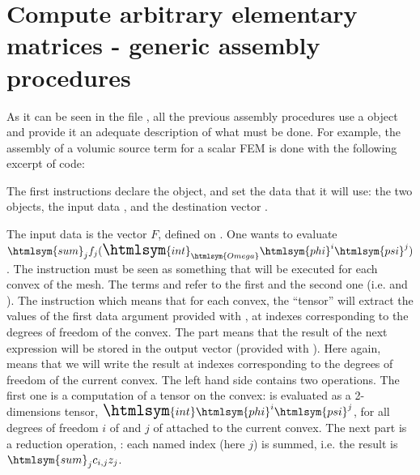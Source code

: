 \documentclass[11pt,a4paper]{article}
\newcommand{\phi}{\htmlsym{phi}}
\newcommand{\psi}{\htmlsym{psi}}
\newcommand{\Omega}{\htmlsym{Omega}}
\newcommand{\sum}{\htmlsym{sum}}
\newcommand{\int}{{\Large\htmlsym{int}}}
\begin{document}
\section{Compute arbitrary elementary matrices - generic assembly procedures}
As it can be seen in the file , all the
previous assembly procedures use a  object and
provide it an adequate description of what must be done. For example, 
the assembly of a volumic source term for a scalar FEM is done with the following excerpt of code:
The first instructions declare the object, and set the data that it will use: the two  objects, the input data , and the destination vector .

The input data is the vector $F$, defined on . One wants to
evaluate $\sum_{j}f_j(\int_\Omega\phi^i\psi^j)$. The instruction must be seen as
something that will be executed for each convex of the mesh. The terms
 and  refer to the first  and the second one
(i.e.  and ).  The instruction 
which means that for each convex, the ``tensor''  will extract
the values of the first data argument provided with ,
at indexes corresponding to the degrees of freedom of the convex. The
part  means that the result of the next expression will be
stored in the output vector (provided with ). Here
again,  means that we will write the result at indexes
corresponding to the degrees of freedom of the current convex. The
left hand side  contains
two operations. The first one is a computation of a tensor on the
convex:  is evaluated as a
2-dimensions tensor, $\int\phi^i\psi^j$, for all degrees of freedom $i$ of  and $j$ of  attached to the current convex. The next
part is a reduction operation, : each named index
(here $j$) is summed, i.e. the result is $\sum_jc_{i,j}z_j$.
\end{document}
